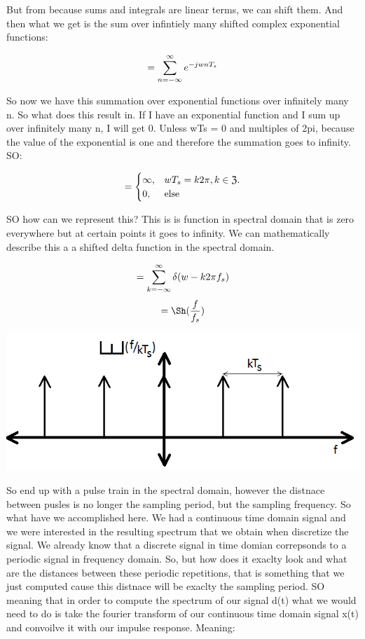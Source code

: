 But from because sums and integrals are linear terms, we can shift them.  And then what we get is the sum over infintiely many shifted complex exponential functions:

\begin{equation*}= \sum^{\infty}_{n=-\infty} e^{-jwnT_{s}} \end{equation*}

So now we have this summation over exponential functions over infinitely many n. So what does this result in.  If I have an exponential function and I sum up over infinitely many n, I will get 0.  Unless wTs  = 0 and multiples of 2pi, because the value of the exponential is one and therefore the summation goes to infinity. SO:

\begin{equation*}= \begin{cases}\infty, & wT_{s} = k2\pi, k \in \mathfrak{Z}.\\ 0, & \text{else}\end{cases} \end{equation*}

SO how can we represent this?  This is is function in spectral domain that is zero everywhere but at certain points it goes to infinity. We can mathematically describe this a a shifted delta function in the spectral domain.

\begin{equation*}= \sum^{\infty}_{k=-\infty}  \delta(w - k2\pi f_{s}) \end{equation*}
\begin{equation*}=  \Sh(\frac{f}{\samplingFreq})\end{equation*}

\includegraphics[width=0.5\linewidth]{Pictures/Chapter_2_Lesson_1/Sampling5.png}

So end up with a pulse train in the spectral domain, however the distnace between pusles is no longer the sampling period, but the sampling frequency.  So what have we accomplished here.  We had a continuous time domain signal and we were interested in the resulting spectrum that we obtain when discretize the signal.  We already know that a discrete signal in time domian correpsonds to a periodic signal in frequency domain.  So, but how does it exaclty look and what are the distances between these periodic repetitions, that is something that we just computed cause this distnace will be exaclty the sampling period. SO meaning that in order to compute the spectrum of our signal d(t) what we would need to do is take the fourier transform of our continuous time domain signal x(t) and convoilve it with our impulse response.  Meaning:

